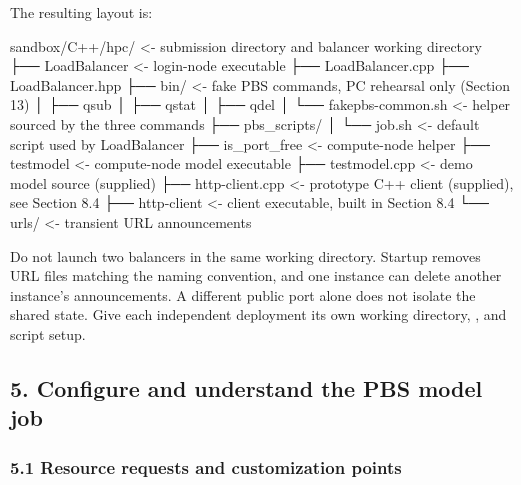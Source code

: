 \documentclass[
  11pt,
  a4paper,
]{article}
\newenvironment{Shaded}{}{}
\newcommand{\NormalTok}[1]{#1}
\DeclareRobustCommand{\InlineCode}[1]{{\ttfamily\upshape\seqsplit{#1}}}
\renewenvironment{Shaded}{\begin{snugshade}}{\end{snugshade}}
\begin{document}
The resulting layout is:


\begin{Shaded}
\begin{Highlighting}[]
\NormalTok{sandbox/C++/hpc/                 \textless{}{-} submission directory and balancer working directory}
\NormalTok{├── LoadBalancer                 \textless{}{-} login{-}node executable}
\NormalTok{├── LoadBalancer.cpp}
\NormalTok{├── LoadBalancer.hpp}
\NormalTok{├── bin/                         \textless{}{-} fake PBS commands, PC rehearsal only (Section 13)}
\NormalTok{│   ├── qsub}
\NormalTok{│   ├── qstat}
\NormalTok{│   ├── qdel}
\NormalTok{│   └── fakepbs{-}common.sh        \textless{}{-} helper sourced by the three commands}
\NormalTok{├── pbs\_scripts/}
\NormalTok{│   └── job.sh                   \textless{}{-} default script used by LoadBalancer}
\NormalTok{├── is\_port\_free                 \textless{}{-} compute{-}node helper}
\NormalTok{├── testmodel                    \textless{}{-} compute{-}node model executable}
\NormalTok{├── testmodel.cpp                \textless{}{-} demo model source (supplied)}
\NormalTok{├── http{-}client.cpp              \textless{}{-} prototype C++ client (supplied), see Section 8.4}
\NormalTok{├── http{-}client                  \textless{}{-} client executable, built in Section 8.4}
\NormalTok{└── urls/                        \textless{}{-} transient URL announcements}
\end{Highlighting}
\end{Shaded}

Do not launch two balancers in the same working directory. Startup
removes URL files matching the naming convention, and one instance can
delete another instance's announcements. A different public port alone
does not isolate the shared state. Give each independent deployment its
own working directory, \InlineCode{urls}, and script setup.

\hypertarget{configure-and-understand-the-pbs-model-job}{%
\subsection{5. Configure and understand the PBS model
job}\label{configure-and-understand-the-pbs-model-job}}

\hypertarget{resource-requests-and-customization-points}{%
\subsubsection{5.1 Resource requests and customization
points}\label{resource-requests-and-customization-points}}
\end{document}
